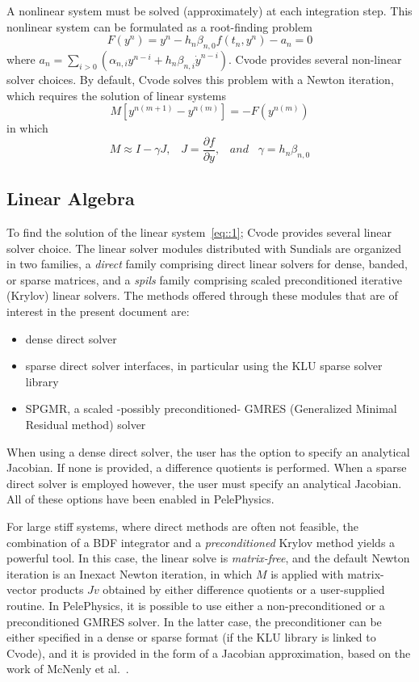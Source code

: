 \documentclass[12pt]{article}
\begin{document}
A nonlinear system must be solved (approximately) at each integration step.  This nonlinear system can be formulated as a  root-finding problem
\begin{equation}
F(y^{n}) = y^n - h_n \beta_{n,0} f(t_n,y^{n}) - a_n = 0
\end{equation}
where $a_n = \sum_{i>0} (\alpha_{n,i} y^{n-i} + h_n\beta_{n,i} \dot{y}^{n-i})$. Cvode provides several non-linear solver choices. By default, Cvode solves this problem with a Newton iteration, which requires the solution of linear systems
\begin{equation}
\label{eq::1}
M[y^{n(m+1)} - y^{n(m)}] = -F(y^{n(m)}) 
\end{equation}
in which
\begin{equation}
M \approx I-\gamma J, \; \; \; J = \frac{\partial f}{ \partial y}, \;\;\; and \;\;\; \gamma =  h_n \beta_{n,0}
\end{equation}


\subsection{Linear Algebra}
\label{sub::LinAlg}
To find the solution of the linear system~\ref{eq::1}; Cvode provides several linear solver choice. The linear solver modules distributed with Sundials are organized in two families, a \textit{direct} family comprising direct linear solvers for dense, banded, or sparse matrices, and a \textit{spils} family comprising scaled preconditioned iterative (Krylov) linear solvers.  The methods offered through these modules that are of interest in the present document are:
\begin{itemize}
\item dense direct solver
\item sparse direct solver interfaces, in particular using the KLU sparse solver library
\item SPGMR, a scaled -possibly preconditioned- GMRES (Generalized Minimal Residual method) solver~\cite{brown1990hybrid}
\end{itemize}
When using a dense direct solver, the user has the option to specify an analytical Jacobian. If none is provided, a difference quotients is performed. When a sparse direct solver is employed however, the user must specify an analytical Jacobian. All of these options have been enabled in PelePhysics.

For large stiff systems,  where direct methods are often not feasible, the combination of a BDF integrator and a \textit{preconditioned} Krylov method yields a powerful tool. In this case, the linear solve is \textit{matrix-free}, and the default Newton iteration is an Inexact Newton iteration, in which $M$ is applied with matrix-vector products $Jv$ obtained by either difference quotients or a user-supplied routine. In PelePhysics, it is possible to use either a non-preconditioned or a preconditioned GMRES solver. In the latter case, the preconditioner can be either specified in a dense or sparse format (if the KLU library is linked to Cvode), and it is provided in the form of a Jacobian approximation, based on the work of McNenly et al.~\cite{mcnenly2015faster}.
\end{document}
